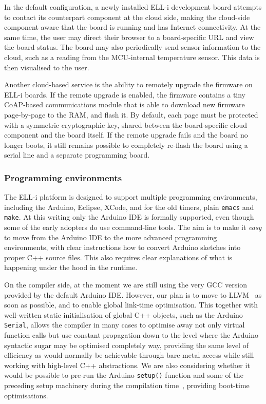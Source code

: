 \documentclass[final]{siamltex}
\begin{document}
In the default configuration, a newly installed ELL-i development
board attempts to contact its counterpart component at the cloud
side, making the cloud-side component aware that the board is running
and has Internet connectivity.  At the same time, the user may direct
their browser to a board-specific URL and view the board status.  The
board may also periodically send sensor information to the cloud, such
as a reading from the MCU-internal temperature sensor.  This data is
then visualised to the user.

Another cloud-based service is the ability to remotely upgrade the
firmware on ELL-i boards.  If the remote upgrade is enabled, the
firmware contains a tiny CoAP-based communications module that is able
to download new firmware page-by-page to the RAM, and flash it.  By
default, each page must be protected with a symmetric cryptographic
key, shared between the board-specific cloud component and the board
itself.  If the remote upgrade fails and the board no longer boots, it
still remains possible to completely re-flash the board using a serial
line and a separate programming board.


\subsubsection{Programming environments}

The ELL-i platform is designed to support multiple programming
environments, including the Arduino, Eclipse, XCode, and for the
old timers, plain \hbox{\tt emacs} and \hbox{\tt make}.  At this
writing only the Arduino IDE is formally supported, even though some
of the early adopters do use command-line tools.  The aim is to make
it {\it easy} to move from the Arduino IDE to the more advanced
programming environments, with clear instructions how to convert
Arduino sketches into proper C++ source files.  This also requires
clear explanations of what is happening under the hood in the runtime.

On the compiler side, at the moment we are still using the very GCC
version provided by the default Arduino IDE.  However, our plan is to
move to LLVM~\cite{lattner2004llvm} as soon as possible, and to enable global
link-time optimisation.  This together with well-written static
initialisation of global C++ objects, such as the Arduino \hbox{\tt
  Serial}, allows the compiler in many cases to optimise away not only
virtual function calls but use constant propagation down to the level
where the Arduino syntactic sugar may be optimised completely way,
providing the same level of efficiency as would normally be
achievable through bare-metal access while still working with
high-level C++ abstractions.  We are also considering whether it would
be possible to pre-run the Arduino \hbox{\tt setup()} function and
some of the preceding setup machinery during the compilation
time~\cite{rintaaho2012clicktofpga}, providing boot-time optimisations.
\end{document}
